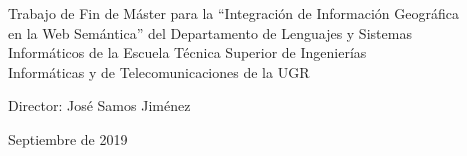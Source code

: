 \begin{titlepage}
\begin{minipage}{\textwidth}

\begin{flushright}
    Trabajo de Fin de Máster para la ``Integración de Información Geográfica \\ en la Web Semántica'' del Departamento de Lenguajes y Sistemas \\ Informáticos de la Escuela Técnica Superior de Ingenierías \\ Informáticas y de Telecomunicaciones de la UGR \\
    
    \vspace{0.2in}
    
    Director: José Samos Jiménez
\end{flushright}

\vspace{4cm}
Septiembre de 2019
\end{minipage}

 
\end{titlepage}


